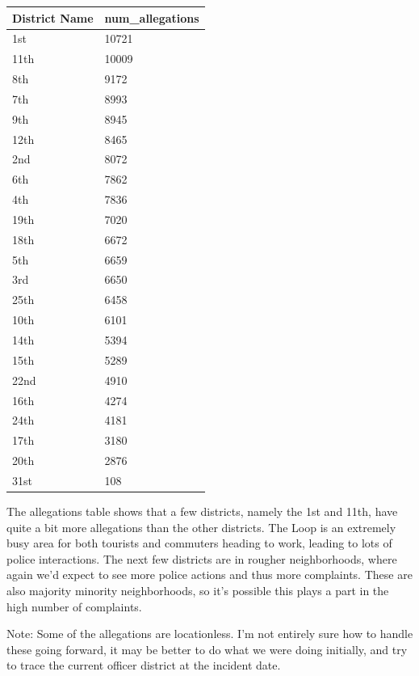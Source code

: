 \documentclass{article}
\begin{document}
\begin{table}[h]
\centering
\begin{tabular}{|l|l|}
\hline
District Name & num\_allegations \\
\hline
1st  & 10721            \\
11th & 10009            \\
8th  & 9172             \\
7th  & 8993             \\
9th  & 8945             \\
12th & 8465             \\
2nd  & 8072             \\
6th  & 7862             \\
4th  & 7836             \\
19th & 7020             \\
18th & 6672             \\
5th  & 6659             \\
3rd  & 6650             \\
25th & 6458             \\
10th & 6101             \\
14th & 5394             \\
15th & 5289             \\
22nd & 4910             \\
16th & 4274             \\
24th & 4181             \\
17th & 3180             \\
20th & 2876             \\
31st & 108      \\
\hline      
\end{tabular}
\end{table}

The allegations table shows that a few districts, namely the 1st and 11th, have quite a bit more allegations than the other districts. The Loop is an extremely busy area for both tourists and commuters heading to work, leading to lots of police interactions. The next few districts are in rougher neighborhoods, where again we'd expect to see more police actions and thus more complaints. These are also majority minority neighborhoods, so it's possible this plays a part in the high number of complaints.

Note: Some of the allegations are locationless. I'm not entirely sure how to handle these going forward, it may be better to do what we were doing initially, and try to trace the current officer district at the incident date.
\end{document}
